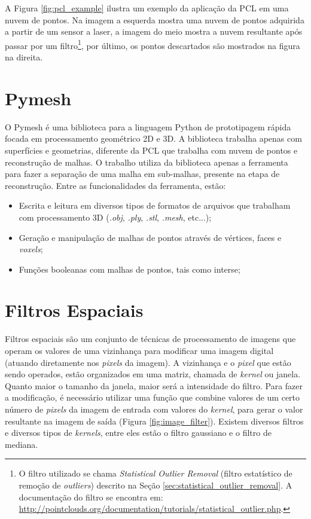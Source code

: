 A Figura \ref{fig:pcl_example} ilustra um exemplo da aplicação da PCL em uma nuvem de pontos. Na imagem a esquerda mostra uma nuvem de pontos adquirida a partir de um sensor a laser, a imagem do meio mostra a nuvem resultante após passar por um filtro\footnote{O filtro utilizado se chama \textit{Statistical Outlier Removal} (filtro estatístico de remoção de \textit{outliers}) descrito na Seção \ref{sec:statistical_outlier_removal}. A documentação do filtro se encontra em: \url{http://pointclouds.org/documentation/tutorials/statistical_outlier.php}.}, por último, os pontos descartados são mostrados na figura na direita.

\section{Pymesh}
\label{sec:pymesh}
O Pymesh é uma biblioteca para a linguagem Python de prototipagem rápida focada em processamento geométrico 2D e 3D. 
A biblioteca trabalha apenas com superfícies e geometrias, diferente da PCL que trabalha com nuvem de pontos e reconstrução de malhas. 
O trabalho utiliza da biblioteca apenas a ferramenta para fazer a separação de uma malha em sub-malhas, presente na etapa de reconstrução.
Entre as funcionalidades da ferramenta, estão: 

\vspace{0.5em}
\begin{itemize}
    \item Escrita e leitura em diversos tipos de formatos de arquivos que trabalham com processamento 3D (\textit{.obj}, \textit{.ply}, \textit{.stl}, \textit{.mesh}, etc...);
    \item Geração e manipulação de malhas de pontos através de vértices, faces e \textit{voxels};
    \item Funções booleanas com malhas de pontos, tais como interse;
\end{itemize}
\vspace{1em}


\iffalse
\section{Filtros Espaciais}
Filtros espaciais são um conjunto de técnicas de processamento de imagens que operam os valores de uma vizinhança para modificar uma imagem digital (atuando diretamente nos \textit{pixels} da imagem). 
A vizinhança e o \textit{pixel} que estão sendo operados, estão organizados em uma matriz, chamada de \textit{kernel} ou janela. 
Quanto maior o tamanho da janela, maior será a intensidade do filtro.
Para fazer a modificação, é necessário utilizar uma função que combine valores de um certo número de \textit{pixels} da imagem de entrada com valores do \textit{kernel}, para gerar o valor resultante na imagem de saída (Figura \ref{fig:image_filter}).
Existem diversos filtros e diversos tipos de \textit{kernels}, entre eles estão o filtro gaussiano e o filtro de mediana.

